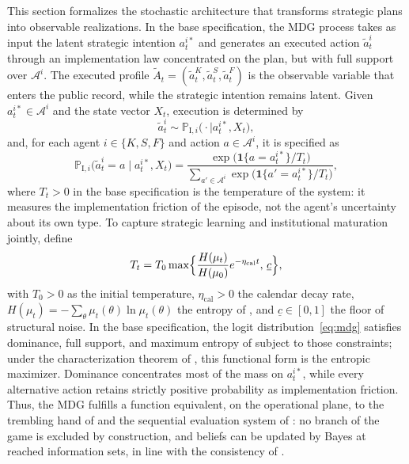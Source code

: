 \documentclass[ecta,nameyear,draft]{econsocart}
\theoremstyle{plain}
\theoremstyle{definition}
\newcommand{\1}{\mathbf{1}}
\newcommand{\ProbI}[1]{\mathbb{P}_{\mathrm{I},#1}}
\begin{document}
This section formalizes the stochastic architecture that transforms strategic plans into observable realizations. In the base specification, the MDG process takes as input the latent strategic intention $a_t^{i\ast}$ and generates an executed action $\tilde{a}_t^i$ through an implementation law concentrated on the plan, but with full support over $\mathcal{A}^i$. The executed profile $\tilde{A}_t=(\tilde{a}_t^K,\tilde{a}_t^S,\tilde{a}_t^F)$ is the observable variable that enters the public record, while the strategic intention remains latent. Given $a_t^{i\ast}\in\mathcal{A}^i$ and the state vector $X_t$, execution is determined by
\[
\tilde{a}_t^i\sim\ProbI{i}\bigl(\cdot\mid a_t^{i\ast},X_t\bigr),
\]
and, for each agent $i\in\{K,S,F\}$ and action $a\in\mathcal{A}^i$, it is specified as
\begin{equation}
\ProbI{i}\bigl(\tilde{a}_t^i=a\mid a_t^{i\ast},X_t\bigr)
=\frac{\exp\bigl(\mathbf{1}\{a=a_t^{i\ast}\}/T_t\bigr)}{\sum_{a'\in\mathcal{A}^i}\exp\bigl(\mathbf{1}\{a'=a_t^{i\ast}\}/T_t\bigr)},
\label{eq:mdg}
\end{equation}
where $T_t>0$ in the base specification is the temperature of the system: it measures the implementation friction of the episode, not the agent's uncertainty about its own type. To capture strategic learning and institutional maturation jointly, define
\begin{equation}
T_t=T_0\max\Bigl\{\frac{H(\mu_t)}{H(\mu_0)}e^{-\eta_{\mathrm{cal}}t},\,\underline{c}\Bigr\},
\label{eq:temperature}
\end{equation}
with $T_0>0$ as the initial temperature, $\eta_{\mathrm{cal}}>0$ the calendar decay rate, $H(\mu_t)=-\sum_\theta\mu_t(\theta)\ln\mu_t(\theta)$ the entropy of \citet{Shannon1948}, and $\underline{c}\in[0,1]$ the floor of structural noise. In the base specification, the logit distribution~\eqref{eq:mdg} satisfies dominance, full support, and maximum entropy of \citet{Shannon1948} subject to those constraints; under the characterization theorem of \citet{Jaynes1957Information}, this functional form is the entropic maximizer. Dominance concentrates most of the mass on $a_t^{i\ast}$, while every alternative action retains strictly positive probability as implementation friction. Thus, the MDG fulfills a function equivalent, on the operational plane, to the trembling hand of \citet{Selten1975Perfectness} and the sequential evaluation system of \citet{KrepsWilson1982}: no branch of the game is excluded by construction, and beliefs can be updated by Bayes at reached information sets, in line with the consistency of \citet{FudenbergTirole1991PBE}.
\end{document}
